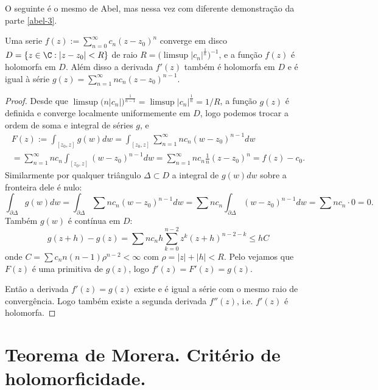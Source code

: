 O seguinte  é o mesmo  de Abel,
mas nessa vez com diferente demonstração da parte \eqref{abel-3}.
\begin{teorema}
\label{t:series-derhol}
Uma serie
$f(z) := \sum_{n=0}^\infty c_n (z-z_0)^n$ converge em disco
$D = \{z\in\C : |z-z_0|<R\}$ de raio $R = \big(\limsup |c_n|^{\frac1n}\big)^{-1}$,
e a função $f(z)$ é holomorfa em $D$.
Além disso a derivada $f'(z)$ também é holomorfa em $D$
e é igual à série $g(z) = \sum_{n=1}^\infty n c_n (z-z_0)^{n-1}$.
\end{teorema}
\begin{proof}
Desde que $\limsup \big(n|c_n|\big)^{\frac{1}{n-1}} = \limsup |c_n|^{\frac1n} = 1/R$,
a função $g(z)$ é definida e converge localmente uniformemente em $D$,
logo podemos trocar a ordem de soma e integral de séries $g$, e
\begin{multline}
F(z) := \int_{[z_0,z]} g(w) dw
= \int_{[z_0,z]} \sum_{n=1}^\infty n c_n (w-z_0)^{n-1} dw
\\
= \sum_{n=1}^\infty n c_n \int_{[z_0,z]} (w-z_0)^{n-1} dw
= \sum_{n=1}^\infty n c_n \frac1n (z-z_0)^n = f(z) - c_0.
\end{multline}
Similarmente por qualquer triângulo $\Delta \subset D$ a integral de $g(w)dw$ sobre a fronteira dele é nulo:
\[ \int_{\partial \Delta} g(w) dw = \int_{\partial \Delta} \sum n c_n (w-z_0)^{n-1} dw
= \sum n c_n \int_{\partial \Delta} (w-z_0)^{n-1} dw = \sum n c_n \cdot 0 = 0. \]
Também $g(w)$ é contínua em $D$:
\[ g(z+h) - g(z) = \sum n c_n h \sum_{k=0}^{n-2} z^k (z+h)^{n-2-k}
\leq h C \]
onde $C = \sum c_n n (n-1) \rho^{n-2} < \infty$ com $\rho = |z|+|h|<R$.
Pelo  vejamos que $F(z)$ é uma primitiva de $g(z)$,
logo $f'(z) = F'(z) = g(z)$.

Então a derivada $f'(z) = g(z)$ existe e é igual a série com o mesmo raio de convergência.
Logo também existe a segunda derivada $f''(z)$, i.e. $f'(z)$ é holomorfa.
\end{proof}

\section{Teorema de Morera. Critério de holomorficidade.}

